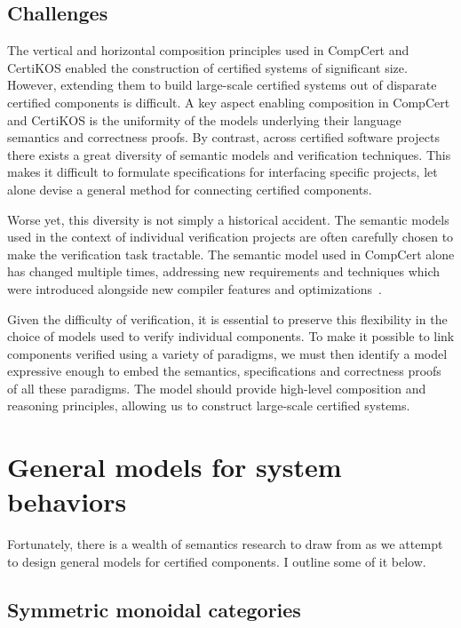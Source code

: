 \documentclass[11pt,oneside,draft]{book}
\theoremstyle{definition}
\begin{document}

\subsection{Challenges} %

The vertical and horizontal composition principles
used in CompCert and CertiKOS
enabled the construction of certified systems
of significant size.
However, extending them to build large-scale certified systems
out of disparate certified components
is difficult.
A key aspect enabling composition in CompCert and CertiKOS
is the uniformity of the models underlying
their language semantics and correctness proofs.
By contrast,
across certified software projects
there exists a great diversity
of semantic models and verification techniques.
This makes it difficult to formulate
specifications for interfacing specific projects,
let alone devise a general method
for connecting certified components.

Worse yet,
this diversity is not simply a historical accident.
The semantic models
used in the context of individual verification projects
are often carefully chosen
to make the verification task tractable.
The semantic model used in CompCert alone
has changed multiple times,
addressing new requirements and techniques
which were introduced alongside
new compiler features and optimizations~\citep{compsem}.

Given the difficulty of verification,
it is essential
to preserve this flexibility in the choice of models
used to verify individual components.
To make it possible to link components
verified using a variety of paradigms,
we must then identify a model
expressive enough to embed
the semantics, specifications and correctness proofs
of all these paradigms.
The model should provide
high-level composition and reasoning principles,
allowing us to construct large-scale certified systems.



\section{General models for system behaviors} %
\label{ssec:genmodel}

Fortunately,
there is a wealth of semantics research to draw from
as we attempt to design general models for certified components.
I outline some of it below.

\subsection{Symmetric monoidal categories} %
\end{document}
